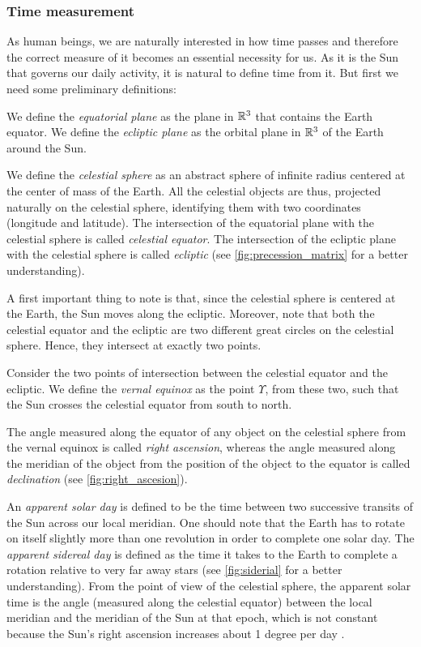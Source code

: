 \documentclass[../main.tex]{subfiles}
\begin{document}
\subsubsection{Time measurement}\label{sec:time_measurement}
As human beings, we are naturally interested in how time passes and therefore the correct measure of it becomes an essential necessity for us. As it is the Sun that governs our daily activity, it is natural to define time from it.
But first we need some preliminary definitions:
\begin{definition}
  We define the \emph{equatorial plane} as the plane in $\mathbb{R}^3$ that contains the Earth equator. We define the \emph{ecliptic plane} as the orbital plane in $\mathbb{R}^3$ of the Earth around the Sun.
\end{definition}
\begin{definition}
  We define the \emph{celestial sphere} as an abstract sphere of infinite radius centered at the center of mass of the Earth. All the celestial objects are thus, projected naturally on the celestial sphere, identifying them with two coordinates (longitude and latitude). The intersection of the equatorial plane with the celestial sphere is called \emph{celestial equator}. The intersection of the ecliptic plane with the celestial sphere is called \emph{ecliptic} (see \cref{fig:precession_matrix} for a better understanding).
\end{definition}
A first important thing to note is that, since the celestial sphere is centered at the Earth, the Sun moves along the ecliptic. Moreover, note that both the celestial equator and the ecliptic are two different great circles on the celestial sphere. Hence, they intersect at exactly two points.

\begin{definition}
  Consider the two points of intersection between the celestial equator and the ecliptic. We define the \emph{vernal equinox} as the point $\Upsilon$, from these two, such that the Sun crosses the celestial equator from south to north.
\end{definition}
The angle measured along the equator of any object on the celestial sphere from the vernal equinox is called \emph{right ascension}, whereas the angle measured along the meridian of the object from the position of the object to the equator is called \emph{declination} (see \cref{fig:right_ascesion}).

An \emph{apparent solar day} is defined to be the time between two successive transits of the Sun across our local meridian. One should note that the Earth has to rotate on itself slightly more than one revolution in order to complete one solar day. The \emph{apparent sidereal day} is defined as the time it takes to the Earth to complete a rotation relative to very far away stars (see \cref{fig:siderial} for a better understanding). From the point of view of the celestial sphere, the apparent solar time is the angle (measured along the celestial equator) between the local meridian and the meridian of the Sun at that epoch, which is not constant because the Sun's right ascension increases about 1 degree per day \cite{montenbruck}.
\end{document}
